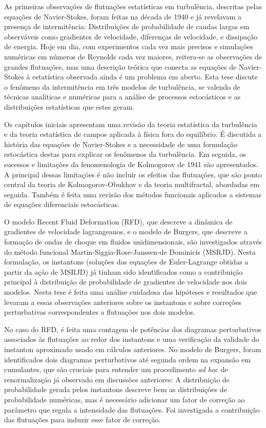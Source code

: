 \documentclass[brazil,12pt,a4paper,openany]{book}
\begin{document}
As primeiras observações de flutuações estatísticas em turbulência, descritas pelas equações de Navier-Stokes, foram feitas na década de 1940 e já revelavam a presença de intermitência: Dis\-tri\-bui\-ções de probabilidade de caudas largas em observáveis como gradientes de velocidade, diferenças de velocidade, e dissipação de energia. Hoje em dia, com experimentos cada vez mais precisos e simulações numéricas em números de Reynolds cada vez maiores, reitera-se as observações de grandes flutuações, mas uma descrição teórica que conecta as equações de Navier-Stokes à estatística observada ainda é um problema em aberto. Esta tese discute o fenômeno da intermitência em três modelos de turbulência, se valendo de técnicas analíticas e numéricas para a análise de processos estocásticos e as distribuições estatísticas que estes geram.

Os capítulos iniciais apresentam uma revisão da teoria estat\'{i}stica da turbulência e da teoria estatística de campos aplicada à física fora do equilíbrio. É discutida a história das equações de Navier-Stokes e a necessidade de uma formulação estocástica destas para explicar os fenômenos da turbulência. Em seguida, os sucessos e limitações da fenomenologia de Kolmogorov de 1941 são apresentados. A principal dessas limitações é não incluir os efeitos das flutuações, que são ponto central da teoria de Kolmogorov-Obukhov e da teoria multifractal, abordadas em seguida. Também é feita uma revisão dos métodos funcionais aplicados a sistemas de equações diferenciais estocásticas.

O modelo Recent Fluid Deformation (RFD), que descreve a dinâmica de gradientes de velocidade lagrangeanos, e o modelo de Burgers, que descreve a formação de ondas de choque em fluidos unidimensionais, são investigados através do método funcional Martin-Siggia-Rose-Janssen-de Dominicis (MSRJD). Nesta formulação, os instantons (soluções das equações de Euler-Lagrange obtidas a partir da ação de MSRJD) já tinham sido identificados como a contribuição principal à distribuição de probabilidade de gradientes de velocidade nos dois modelos. Nesta tese é feita uma análise cuidadosa das hipóteses e resultados que levaram a essas observações anteriores sobre os instantons e sobre correções perturbativas correspondentes a flutuações nos dois modelos.

No caso do RFD, é feita uma contagem de potências dos diagramas perturbativos associados às flutuações ao redor dos instantons e uma verificação da validade do instanton aproximado usado em cálculos anteriores. No modelo de Burgers, foram identificados dois diagramas perturbativos até segunda ordem na expansão em cumulantes, que são cruciais para entender um procedimento \textit{ad hoc} de renormalização já observado em discussões anteriores: A distribuição de probabilidade gerada pelos instantons descreve bem as distribuições de probabilidade numéricas, mas é necessário adicionar um fator de correção ao parâmetro que regula a intensidade das flutuações. Foi investigada a contribuição das flutuações para induzir esse fator de correção.
\end{document}
